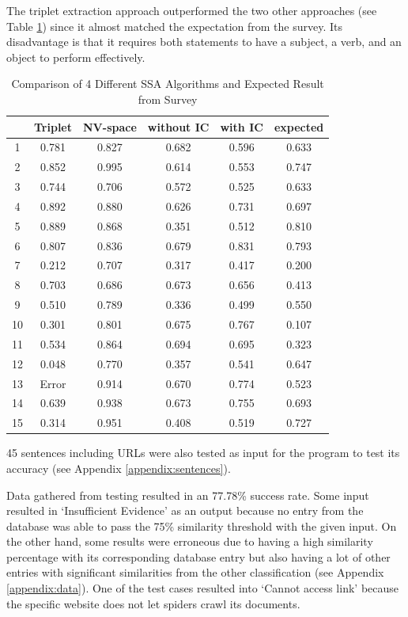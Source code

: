 \documentclass[journal]{./IEEEtran}
\begin{document}
	The triplet extraction approach outperformed the two other approaches (see Table \ref{tableb}) since it almost matched the expectation from the survey. Its disadvantage is that it requires both statements to have a subject, a verb, and an object to perform effectively.
	
	\begin{table}[h!]
	\caption{Comparison of 4 Different SSA Algorithms and Expected Result from Survey}
    	\begin{center}
    		\begin{tabular}{ |c|c|c|c|c|c| } 
    			\hline
    			& Triplet & NV-space & without IC & with IC & expected \\ 
    			\hline
    			1 & 0.781 & 0.827 & 0.682 & 0.596 & 0.633 \\ 
    			2 & 0.852 & 0.995 & 0.614 & 0.553 & 0.747 \\
    			3 & 0.744 & 0.706 & 0.572 & 0.525 & 0.633 \\ 
    			4 & 0.892 & 0.880 & 0.626 & 0.731 & 0.697 \\ 
    			5 & 0.889 & 0.868 & 0.351 & 0.512 & 0.810 \\ 
    			6 & 0.807 & 0.836 & 0.679 & 0.831 & 0.793 \\ 
    			7 & 0.212 & 0.707 & 0.317 & 0.417 & 0.200 \\ 
    			8 & 0.703 & 0.686 & 0.673 & 0.656 & 0.413 \\ 
    			9 & 0.510 & 0.789 & 0.336 & 0.499 & 0.550 \\ 
    			10 & 0.301 & 0.801 & 0.675 & 0.767 & 0.107 \\ 
    			11 & 0.534 & 0.864 & 0.694 & 0.695 & 0.323 \\ 
    			12 & 0.048 & 0.770 & 0.357 & 0.541 & 0.647 \\ 
    			13 & Error & 0.914 & 0.670 & 0.774 & 0.523 \\ 
    			14 & 0.639 & 0.938 & 0.673 & 0.755 & 0.693 \\ 
    			15 & 0.314 & 0.951 & 0.408 & 0.519 & 0.727 \\  
    			\hline
    		\end{tabular}
    		
    		\label{tableb}
    	\end{center}
    \end{table}
	45 sentences including URLs were also tested as input for the program to test its accuracy (see Appendix \ref{appendix:sentences}).
	
	Data gathered from testing resulted in an 77.78\% success rate. Some input resulted in `Insufficient Evidence' as an output because no entry from the database was able to pass the 75\% similarity threshold with the given input. On the other hand, some results were erroneous due to having a high similarity percentage with its corresponding database entry but also having a lot of other entries with significant similarities from the other classification (see Appendix \ref{appendix:data}). One of the test cases resulted into `Cannot access link' because the specific website does not let spiders crawl its documents.
	
\end{document}
